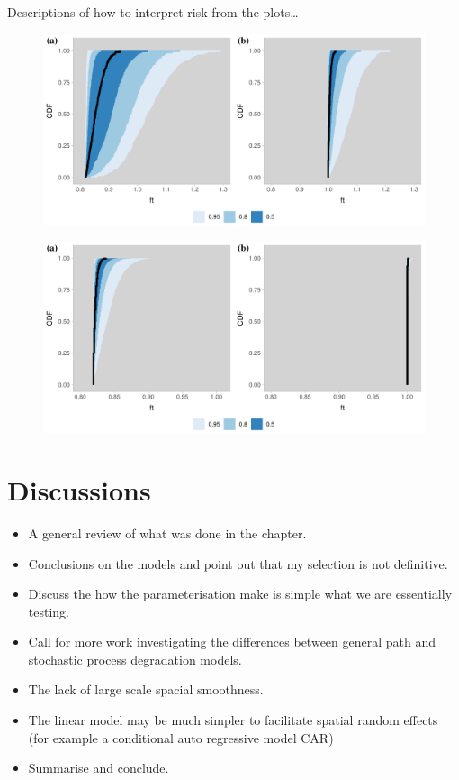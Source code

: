 Descriptions of how to interpret risk from the plots\ldots

\begin{figure}
  \centering
  \includegraphics[width=\textwidth]{figures/ch-6/belt_wear_failuretime_CDF_gp.pdf}
  \caption{}
  \label{fig:beltwear-ft-gp}
\end{figure}

\begin{figure}
  \centering
  \includegraphics[width=\textwidth]{figures/ch-6/belt_wear_failuretime_CDF_lm.pdf}
  \caption{}
  \label{fig:beltwear-ft-lm}
\end{figure}

\section{Discussions}

\begin{itemize}
  \item A general review of what was done in the chapter.
  \item Conclusions on the models and point out that my selection is not definitive.
  \item Discuss the how the parameterisation make is simple what we are essentially testing.
  \item Call for more work investigating the differences between general path and stochastic process degradation models.
  \item The lack of large scale spacial smoothness.
  \item The linear model may be much simpler to facilitate spatial random effects (for example a conditional auto regressive model CAR)
  \item Summarise and conclude.
\end{itemize}
